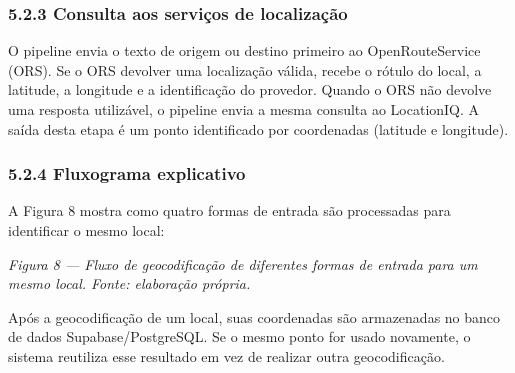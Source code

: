 \documentclass[brazil,]{article}
\let\oldsubsubsection\subsubsection
\renewcommand{\subsubsection}{\Needspace{10\baselineskip}\oldsubsubsection}
\begin{document}
\hypertarget{consulta-aos-serviuxe7os-de-localizauxe7uxe3o}{%
\subsubsection{5.2.3 Consulta aos serviços de
localização}\label{consulta-aos-serviuxe7os-de-localizauxe7uxe3o}}

O pipeline envia o texto de origem ou destino primeiro ao
OpenRouteService (ORS). Se o ORS devolver uma localização válida, recebe
o rótulo do local, a latitude, a longitude e a identificação do
provedor. Quando o ORS não devolve uma resposta utilizável, o pipeline
envia a mesma consulta ao LocationIQ. A saída desta etapa é um ponto
identificado por coordenadas (latitude e longitude).

\hypertarget{fluxograma-explicativo}{%
\subsubsection{5.2.4 Fluxograma
explicativo}\label{fluxograma-explicativo}}

A Figura 8 mostra como quatro formas de entrada são processadas para
identificar o mesmo local:

\begin{center}
\end{center}

\emph{Figura 8 --- Fluxo de geocodificação de diferentes formas de
entrada para um mesmo local. Fonte: elaboração própria.}

Após a geocodificação de um local, suas coordenadas são armazenadas no
banco de dados Supabase/PostgreSQL. Se o mesmo ponto for usado
novamente, o sistema reutiliza esse resultado em vez de realizar outra
geocodificação.
\end{document}
